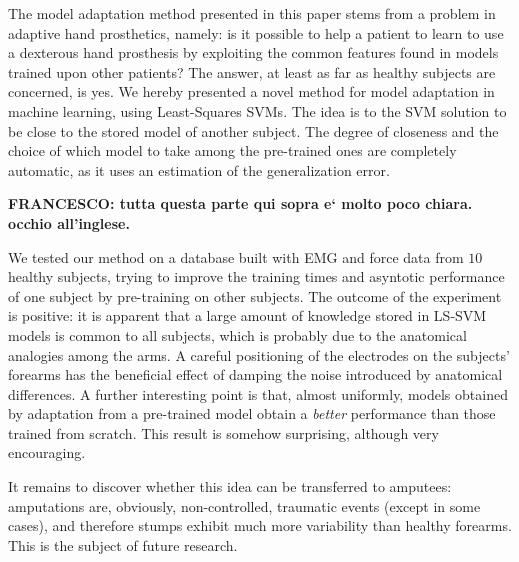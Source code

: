 The model adaptation method presented in this paper stems from a
problem in adaptive hand prosthetics, namely: is it possible to help a
patient to learn to use a dexterous hand prosthesis 
by exploiting the common features found in models trained
upon other patients? The answer, at least as far as healthy subjects
are concerned, is yes. We hereby presented a novel method for
model adaptation in machine learning, using Least-Squares SVMs. The
idea is to 
the SVM solution to be close to the stored model
of another subject. The degree of closeness and the choice of which model
to take among the pre-trained ones are completely automatic, as it uses an estimation
of the generalization error.

\textbf{FRANCESCO: tutta questa parte qui sopra e` molto poco chiara. occhio all'inglese.}

We tested our method on a database built with EMG and force data from
$10$ healthy subjects, trying to improve the training times and
asyntotic performance of one subject by pre-training on other
subjects. The outcome of the experiment is positive: it is apparent
that a large amount of knowledge stored in LS-SVM models is common to
all subjects, which is probably due to the anatomical analogies among
the arms. A careful positioning of the electrodes on the subjects'
forearms has the beneficial effect of damping the noise introduced by
anatomical differences. A further interesting point is that, almost
uniformly, models obtained by adaptation from a pre-trained model
obtain a \emph{better} performance than those trained from
scratch. This result is somehow surprising, although very encouraging.

It remains to discover whether this idea can be transferred to
amputees: amputations are, obviously, non-controlled, traumatic events
(except in some cases), and therefore stumps exhibit much more
variability than healthy forearms. This is the subject of future
research.
